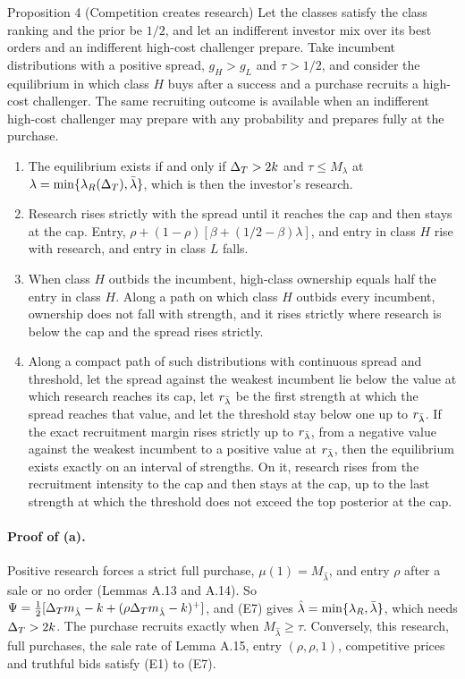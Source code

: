 \begin{paperresult}{Proposition 4 (Competition creates research)}
Let the classes satisfy the class ranking and the prior be \(1/2\), and let an indifferent investor mix over its best
orders and an indifferent high-cost challenger prepare. Take incumbent distributions with a positive spread,
\(g_H>g_L\) and \(\tau>1/2\), and consider the equilibrium in which class \(H\) buys after a success and a purchase
recruits a high-cost challenger. The same recruiting outcome is available when an indifferent high-cost challenger
may prepare with any probability and prepares fully at the purchase.
\begin{enumerate}[label=(\alph*),leftmargin=2em]
\item The equilibrium exists if and only if \(\Delta_T>2k\) and \(\tau\le M_\lambda\) at \(\lambda=\min\{\lambda_R(\Delta_T),\bar\lambda\}\),
which is then the investor's research.
\item Research rises strictly with the spread until it reaches the cap and then stays at the cap. Entry,
\(\rho+(1-\rho)[\beta+(1/2-\beta)\lambda]\), and entry in class \(H\) rise with research, and entry in class \(L\) falls.
\item When class \(H\) outbids the incumbent, high-class ownership equals half the entry in class \(H\). Along a path on
which class \(H\) outbids every incumbent, ownership does not fall with strength, and it rises strictly where research
is below the cap and the spread rises strictly.
\item Along a compact path of such distributions with continuous spread and threshold, let the spread against the
weakest incumbent lie below the value at which research reaches its cap, let \(r_{\bar\lambda}\) be the first strength at
which the spread reaches that value, and let the threshold stay below one up to \(r_{\bar\lambda}\). If the exact recruitment
margin rises strictly up to \(r_{\bar\lambda}\), from a negative value against the weakest incumbent to a positive value at
\(r_{\bar\lambda}\), then the equilibrium exists exactly on an interval of strengths. On it, research rises from the
recruitment intensity to the cap and then stays at the cap, up to the last strength at which the threshold does not
exceed the top posterior at the cap.
\end{enumerate}
\end{paperresult}

\paragraph{Proof of (a).} Positive research forces a strict full purchase, \(\mu(1)=M_{\hat\lambda}\), and entry \(\rho\)
after a sale or no order (Lemmas A.13 and A.14). So
\(\Psi=\tfrac12[\Delta_T m_{\hat\lambda}-k+(\rho\Delta_T m_{\hat\lambda}-k)^+]\), and (E7) gives \(\hat\lambda=\min\{\lambda_R,\bar\lambda\}\),
which needs \(\Delta_T>2k\). The purchase recruits exactly when \(M_{\hat\lambda}\ge\tau\). Conversely, this research, full
purchases, the sale rate of Lemma A.15, entry \((\rho,\rho,1)\), competitive prices and truthful bids satisfy (E1) to
(E7).

